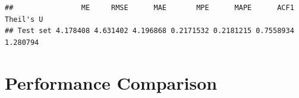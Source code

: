 \documentclass[
]{article}
\newenvironment{Shaded}{\begin{snugshade}}{\end{snugshade}}
\newcommand{\FunctionTok}[1]{\textcolor[rgb]{0.13,0.29,0.53}{\textbf{#1}}}
\newcommand{\NormalTok}[1]{#1}
\newcommand{\OtherTok}[1]{\textcolor[rgb]{0.56,0.35,0.01}{#1}}
\newcommand{\SpecialCharTok}[1]{\textcolor[rgb]{0.81,0.36,0.00}{\textbf{#1}}}
\begin{document}
\begin{Shaded}
\end{Shaded}

\begin{verbatim}
##                ME     RMSE      MAE       MPE      MAPE      ACF1 Theil's U
## Test set 4.178408 4.631402 4.196868 0.2171532 0.2181215 0.7558934  1.280794
\end{verbatim}

\section{Performance Comparison}\label{performance-comparison}
\end{document}
